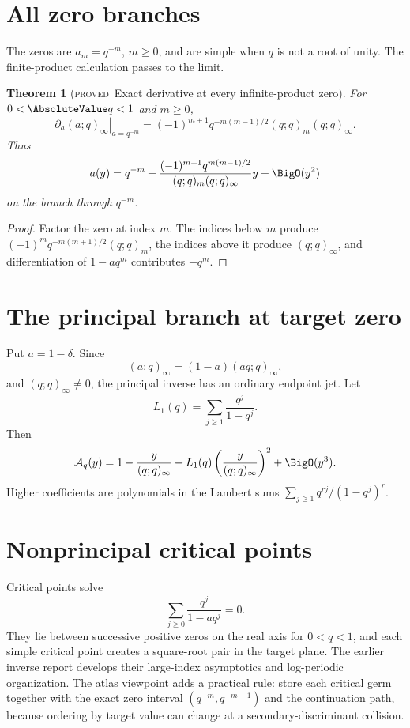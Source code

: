 \documentclass[11pt,letterpaper,oneside,openany]{book}
\newtheorem{theorem}{Theorem}[chapter]
\theoremstyle{definition}
\theoremstyle{remark}
\newcommand{\Aq}{\mathcal A_q}
\newcommand{\statusproved}{\textcolor{provedgreen}{\textsc{proved}}}
\begin{document}
\section{All zero branches}
The zeros are \(a_m=q^{-m}\), \(m\ge0\), and are simple when \(q\) is not a
root of unity.  The finite-product calculation passes to the limit.

\begin{theorem}[\statusproved\ Exact derivative at every infinite-product zero]
For \(0<\AbsoluteValue q<1\) and \(m\ge0\),
\begin{equation}
 \left.\partial_a(a;q)_\infty\right|_{a=q^{-m}}
 =(-1)^{m+1}q^{-m(m-1)/2}(q;q)_m(q;q)_\infty.
 \label{eq:infinite-zero-derivative}
\end{equation}
Thus
\[
 a(y)=q^{-m}+
 \frac{(-1)^{m+1}q^{m(m-1)/2}}
 {(q;q)_m(q;q)_\infty}y+\BigO(y^2)
\]
on the branch through \(q^{-m}\).
\end{theorem}
\begin{proof}
Factor the zero at index \(m\).  The indices below \(m\) produce
\((-1)^mq^{-m(m+1)/2}(q;q)_m\), the indices above it produce
\((q;q)_\infty\), and differentiation of \(1-aq^m\) contributes \(-q^m\).
\end{proof}

\section{The principal branch at target zero}
Put \(a=1-\delta\).  Since
\[
 (a;q)_\infty=(1-a)(aq;q)_\infty,
\]
and \((q;q)_\infty\ne0\), the principal inverse has an ordinary endpoint jet.
Let
\[
 L_1(q)=\sum_{j\ge1}\frac{q^j}{1-q^j}.
\]
Then
\begin{equation}
 \Aq(y)=1-\frac{y}{(q;q)_\infty}
 +L_1(q)\left(\frac{y}{(q;q)_\infty}\right)^2
 +\BigO(y^3).
 \label{eq:principal-inverse-zero-target}
\end{equation}
Higher coefficients are polynomials in the Lambert sums
\(\sum_{j\ge1}q^{rj}/(1-q^j)^r\).

\section{Nonprincipal critical points}
Critical points solve
\[
 \sum_{j\ge0}\frac{q^j}{1-aq^j}=0.
\]
They lie between successive positive zeros on the real axis for \(0<q<1\),
and each simple critical point creates a square-root pair in the target plane.
The earlier inverse report develops their large-index asymptotics and
log-periodic organization.  The atlas viewpoint adds a practical rule: store
each critical germ together with the exact zero interval \((q^{-m},q^{-m-1})\)
and the continuation path, because ordering by target value can change at a
secondary-discriminant collision.
\end{document}
